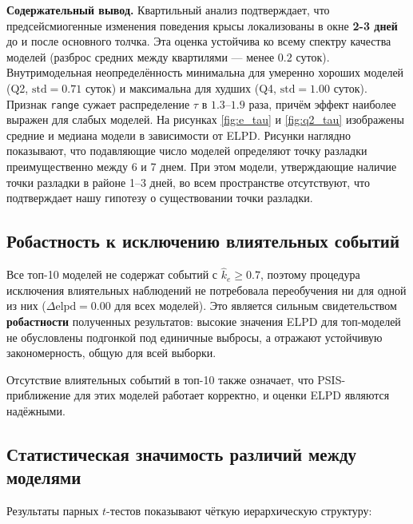 \documentclass[14pt]{mmcs_article}
\begin{document}
	\textbf{Содержательный вывод.}
	Квартильный анализ подтверждает, что предсейсмиогенные изменения поведения крысы локализованы в окне \textbf{2-3  дней} до и после основного
	толчка. Эта оценка устойчива ко всему спектру качества моделей
	(разброс средних между квартилями — менее $0.2$ суток).
	Внутримодельная неопределённость минимальна для умеренно
	хороших моделей (Q2, $\mathrm{std} = 0.71$ суток) и
	максимальна для худших (Q4, $\mathrm{std} = 1.00$ суток).
	Признак \texttt{range} сужает распределение $\tau$ в
	$1.3$--$1.9$ раза, причём эффект наиболее выражен для слабых
	моделей. На рисунках \ref{fig:e_tau} и \ref{fig:q2_tau} изображены средние и медиана модели в зависимости от ELPD. Рисунки наглядно показывают, что подавляющие число моделей определяют точку разладки преимущественно между 6 и 7 днем. При этом модели, утверждающие наличие точки разладки в районе 1--3 дней, во всем пространстве отсутствуют, что подтверждает нашу гипотезу о существовании точки разладки.
	
	\subsection{Робастность к исключению влиятельных \linebreak событий}
	
	Все топ-10 моделей не содержат событий с
	$\hat{k}_e \geq 0.7$, поэтому процедура исключения
	влиятельных наблюдений не потребовала переобучения ни для
	одной из них ($\Delta\mathrm{elpd} = 0.00$ для всех
	моделей). Это является сильным свидетельством
	\textbf{робастности} полученных результатов: высокие
	значения ELPD для топ-моделей не обусловлены подгонкой под
	единичные выбросы, а отражают устойчивую закономерность,
	общую для всей выборки.
	
	Отсутствие влиятельных событий в топ-10 также означает, что
	PSIS-приближение для этих моделей работает корректно, и
	оценки ELPD являются надёжными.
	
	\subsection{Статистическая значимость различий между моделями}
	\label{sec:paired_ttest}
	
	Результаты парных $t$-тестов показывают чёткую иерархическую
	структуру:
	
\end{document}
